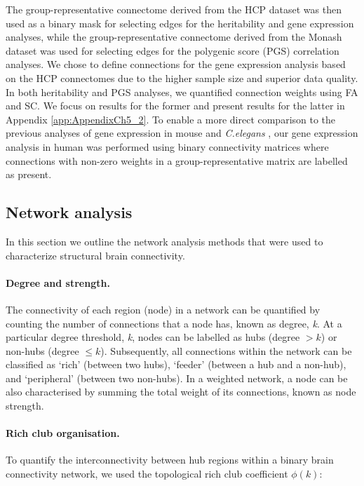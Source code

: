 The group-representative connectome derived from the HCP dataset was then used as a binary mask for selecting edges for the heritability and gene expression analyses, while the group-representative connectome derived from the Monash dataset was used for selecting edges for the polygenic score (PGS) correlation analyses. We chose to define connections for the gene expression analysis based on the HCP connectomes due to the higher sample size and superior data quality. In both heritability and PGS analyses, we quantified connection weights using FA and SC. We focus on results for the former and present results for the latter in Appendix \ref{app:AppendixCh5_2}. To enable a more direct comparison to the previous analyses of gene expression in mouse \citep{Fulcher2016} and \textit{C.elegans} \citep{Arnatkeviciute2018}, our gene expression analysis in human was performed using binary connectivity matrices where connections with non-zero weights in a group-representative matrix are labelled as present. 


\subsection{Network analysis}
In this section we outline the network analysis methods that were used to characterize structural brain connectivity.

\paragraph*{Degree and strength.}

The connectivity of each region (node) in a network can be quantified by counting the number of connections that a node has, known as degree, \textit{k}. At a particular degree threshold, \textit{k}, nodes can be labelled as hubs (degree $> k$) or non-hubs (degree $\leq k$). Subsequently, all connections within the network can be classified as `rich' (between two hubs), `feeder' (between a hub and a non-hub), and `peripheral' (between two non-hubs). In a weighted network, a node can be also characterised by summing the total weight of its connections, known as node strength.

\paragraph*{Rich club organisation.}

To quantify the interconnectivity between hub regions within a binary brain connectivity network, we used the topological rich club coefficient $\phi(k)$:

